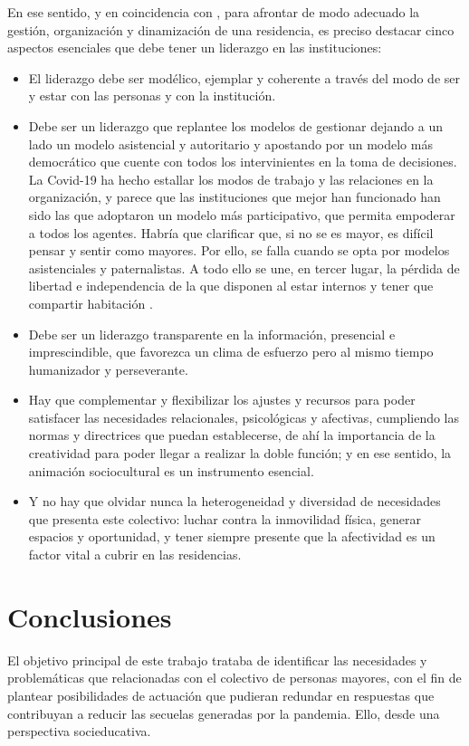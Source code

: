 \documentclass[spanish]{textolivre}
\begin{document}
En ese sentido, y en coincidencia con \textcite{bermejo2020}, %
para afrontar de modo adecuado la gestión, organización y dinamización de una residencia, es preciso destacar cinco aspectos esenciales que debe tener un liderazgo en las instituciones:

\begin{itemize}
    \item El liderazgo debe ser modélico, ejemplar y coherente a través del modo de ser y estar con las personas y con la institución.
    \item Debe ser un liderazgo que replantee los modelos de gestionar dejando a un lado un modelo asistencial y autoritario y apostando por un modelo más democrático que cuente con todos los intervinientes en la toma de decisiones. La Covid-19 ha hecho estallar los modos de trabajo y las relaciones en la organización, y parece que las instituciones que mejor han funcionado han sido las que adoptaron un modelo más participativo, que permita empoderar a todos los agentes. Habría que clarificar que, si no se es mayor, es difícil pensar y sentir como mayores. Por ello, se falla cuando se opta por modelos asistenciales y paternalistas. A todo ello se une, en tercer lugar, la pérdida de libertad e independencia de la que disponen al estar internos y tener que compartir habitación \cite{martinezdemiguel2009}. %
    
    \item Debe ser un liderazgo transparente en la información, presencial e imprescindible, que favorezca un clima de esfuerzo pero al mismo tiempo humanizador y perseverante.
    \item Hay que complementar y flexibilizar los ajustes y recursos para poder satisfacer las necesidades relacionales, psicológicas y afectivas, cumpliendo las normas y directrices que puedan establecerse, de ahí la importancia de la creatividad para poder llegar a realizar la doble función; y en ese sentido, la animación sociocultural es un instrumento esencial.
    \item Y no hay que olvidar nunca la heterogeneidad y diversidad de necesidades que presenta este colectivo: luchar contra la inmovilidad física, generar espacios y oportunidad, y tener siempre presente que la afectividad es un factor vital a cubrir en las residencias.
\end{itemize}

\section{Conclusiones}
El objetivo principal de este trabajo trataba de identificar las necesidades y problemáticas que relacionadas con el colectivo de personas mayores, con el fin de plantear posibilidades de actuación que pudieran redundar en respuestas que contribuyan a reducir las secuelas generadas por la pandemia. Ello, desde una perspectiva socieducativa.
\end{document}
